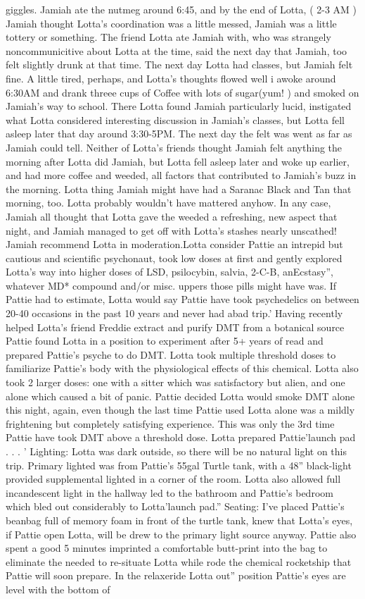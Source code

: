 \documentclass[12pt]{book}
\begin{document}
giggles. Jamiah ate the nutmeg around 6:45, and by the end of Lotta, ( 2-3 AM ) Jamiah thought Lotta's coordination was a little messed, Jamiah was a little tottery or something. The friend Lotta ate Jamiah with, who was strangely noncommunicitive about Lotta at the time, said the next day that Jamiah, too felt slightly drunk at that time. The next day Lotta had classes, but Jamiah felt fine. A little tired, perhaps, and Lotta's thoughts flowed well i awoke around 6:30AM and drank threee cups of Coffee with lots of sugar(yum! ) and smoked on Jamiah's way to school. There Lotta found Jamiah particularly lucid, instigated what Lotta considered interesting discussion in Jamiah's classes, but Lotta fell asleep later that day around 3:30-5PM. The next day the felt was went as far as Jamiah could tell. Neither of Lotta's friends thought Jamiah felt anything the morning after Lotta did Jamiah, but Lotta fell asleep later and woke up earlier, and had more coffee and weeded, all factors that contributed to Jamiah's buzz in the morning. Lotta thing Jamiah might have had a Saranac Black and Tan that morning, too. Lotta probably wouldn't have mattered anyhow. In any case, Jamiah all thought that Lotta gave the weeded a refreshing, new aspect that night, and Jamiah managed to get off with Lotta's stashes nearly unscathed! Jamiah recommend Lotta in moderation.Lotta consider Pattie an intrepid but cautious and scientific psychonaut, took low doses at first and gently explored Lotta's way into higher doses of LSD, psilocybin, salvia, 2-C-B, anEcstasy'', whatever MD* compound and/or misc. uppers those pills might have was. If Pattie had to estimate, Lotta would say Pattie have took psychedelics on between 20-40 occasions in the past 10 years and never had abad trip.' Having recently helped Lotta's friend Freddie extract and purify DMT from a botanical source Pattie found Lotta in a position to experiment after 5+ years of read and prepared Pattie's psyche to do DMT. Lotta took multiple threshold doses to familiarize Pattie's body with the physiological effects of this chemical. Lotta also took 2 larger doses: one with a sitter which was satisfactory but alien, and one alone which caused a bit of panic. Pattie decided Lotta would smoke DMT alone this night, again, even though the last time Pattie used Lotta alone was a mildly frightening but completely satisfying experience. This was only the 3rd time Pattie have took DMT above a threshold dose. Lotta prepared Pattie'launch pad . . . ' Lighting: Lotta was dark outside, so there will be no natural light on this trip. Primary lighted was from Pattie's 55gal Turtle tank, with a 48'' black-light provided supplemental lighted in a corner of the room. Lotta also allowed full incandescent light in the hallway led to the bathroom and Pattie's bedroom which bled out considerably to Lotta'launch pad.'' Seating: I've placed Pattie's beanbag full of memory foam in front of the turtle tank, knew that Lotta's eyes, if Pattie open Lotta, will be drew to the primary light source anyway. Pattie also spent a good 5 minutes imprinted a comfortable butt-print into the bag to eliminate the needed to re-situate Lotta while rode the chemical rocketship that Pattie will soon prepare. In the relaxeride Lotta out'' position Pattie's eyes are level with the bottom of 
\end{document}
